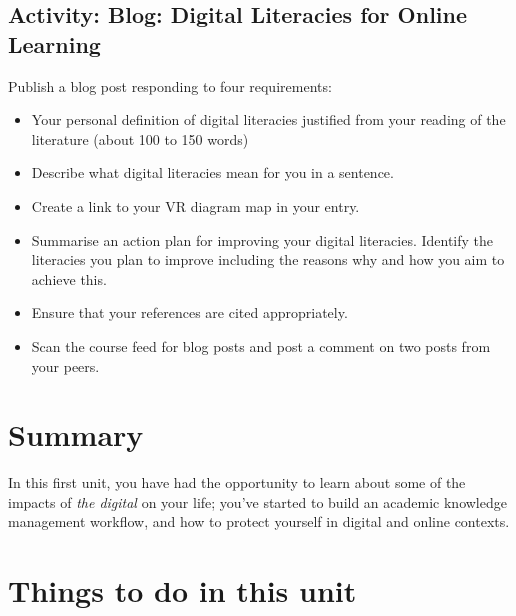 \documentclass[
]{book}
\providecommand{\tightlist}{%
  \setlength{\itemsep}{0pt}\setlength{\parskip}{0pt}}
\theoremstyle{definition}
\theoremstyle{definition}
\theoremstyle{definition}
\theoremstyle{definition}
\theoremstyle{remark}
\begin{document}
\hypertarget{activity-blog-digital-literacies-for-online-learning}{%
\subsection*{Activity: Blog: Digital Literacies for Online Learning}\label{activity-blog-digital-literacies-for-online-learning}}

\begin{reflect}
Publish a blog post responding to four requirements:

\begin{itemize}
\tightlist
\item
  Your personal definition of digital literacies justified from your reading of the literature (about 100 to 150 words)
\item
  Describe what digital literacies mean for you in a sentence.
\item
  Create a link to your VR diagram map in your entry.
\item
  Summarise an action plan for improving your digital literacies. Identify the literacies you plan to improve including the reasons why and how you aim to achieve this.
\item
  Ensure that your references are cited appropriately.
\item
  Scan the course feed for blog posts and post a comment on two posts from your peers.
\end{itemize}
\end{reflect}

\hypertarget{summary}{%
\section*{Summary}\label{summary}}

In this first unit, you have had the opportunity to learn about some of the impacts of \emph{the digital} on your life; you've started to build an academic knowledge management workflow, and how to protect yourself in digital and online contexts.

\hypertarget{things-to-do-in-this-unit}{%
\section*{Things to do in this unit}\label{things-to-do-in-this-unit}}
\end{document}
